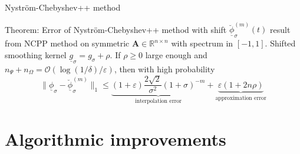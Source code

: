 \documentclass[aspectratio=169, leqno, 12pt]{beamer}
\newcommand{\mtx}[1]{\boldsymbol{#1}}
\begin{document}
\begin{frame}{Nystr\"om-Chebyshev++ method}
    \begin{block}{Theorem: Error of Nystr\"om-Chebyshev++ method with shift}
        $\underline{\breve{\phi}}_{\sigma}^{(m)}(t)$ result from \gls{NCPP} method
        on symmetric $\mtx{A} \in \mathbb{R}^{n \times n}$ with spectrum in $[-1, 1]$.
        Shifted smoothing kernel $\underline{g}_{\sigma}=g_{\sigma} + \rho$.
        If $\rho \geq 0$ large enough and $n_{\Psi} + n_{\Omega} = \mathcal{O}(\log(1/\delta)/\varepsilon)$,
        then with high probability
        \begin{equation}
            \lVert \underline{\phi}_{\sigma} - \breve{\underline{\phi}}_{\sigma}^{(m)} \rVert _1
            \leq \underbrace{(1 + \varepsilon) \frac{2\sqrt{2}}{\sigma^2} (1 + \sigma)^{-m}}_{\text{interpolation error}}
            + \underbrace{\varepsilon(1 + 2 n \rho)}_{\text{approximation error}}
        \end{equation}
    \end{block}
\end{frame}

\section{Algorithmic improvements}
\end{document}
